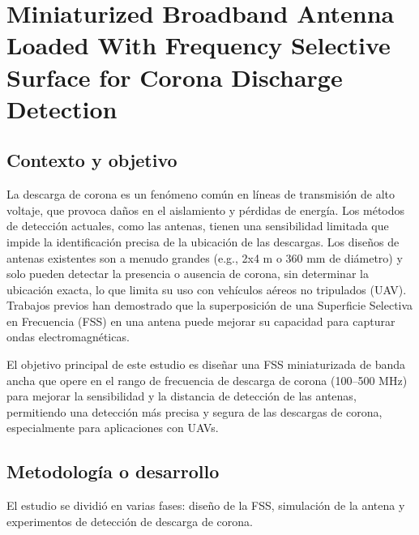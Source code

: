 \section{Miniaturized Broadband Antenna Loaded With Frequency Selective Surface for Corona Discharge Detection}

\subsection*{Contexto y objetivo}
La descarga de corona es un fenómeno común en líneas de transmisión de alto voltaje, que provoca daños en el aislamiento y pérdidas de energía. Los métodos de detección actuales, como las antenas, tienen una sensibilidad limitada que impide la identificación precisa de la ubicación de las descargas. Los diseños de antenas existentes son a menudo grandes (e.g., 2x4 m o 360 mm de diámetro) y solo pueden detectar la presencia o ausencia de corona, sin determinar la ubicación exacta, lo que limita su uso con vehículos aéreos no tripulados (UAV). Trabajos previos han demostrado que la superposición de una Superficie Selectiva en Frecuencia (FSS) en una antena puede mejorar su capacidad para capturar ondas electromagnéticas.

El objetivo principal de este estudio es diseñar una FSS miniaturizada de banda ancha que opere en el rango de frecuencia de descarga de corona (100–500 MHz) para mejorar la sensibilidad y la distancia de detección de las antenas, permitiendo una detección más precisa y segura de las descargas de corona, especialmente para aplicaciones con UAVs.

\subsection*{Metodología o desarrollo}
El estudio se dividió en varias fases: diseño de la FSS, simulación de la antena y experimentos de detección de descarga de corona.

